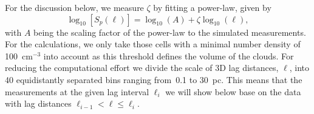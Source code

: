 For the discussion below, we measure $\zeta$ by fitting a power-law, given by
\begin{equation}
	\log_{10}\left[ S_p(\ell) \right] = \log_{10}\left(A\right) + \zeta \log_{10}(\ell) ,
    \label{equ:method:fitting}
\end{equation}
with $A$ being the scaling factor of the power-law to the simulated measurements.
For the calculations, we only take those cells with a minimal number density of 100~cm$^{-3}$ into account as this threshold defines the volume of the clouds.
For reducing the computational effort we divide the scale of 3D lag distances, $\ell$, into 40 equidistantly separated bins ranging from~0.1 to 30~pc.
This means that the measurements at the given lag interval $\ell_i$ we will show below base on the data with lag distances $\ell_{i-1} < \ell \leq \ell_i$.


\endinput
